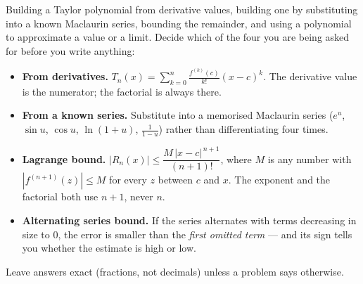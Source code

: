 \documentclass[12pt]{article}
\begin{document}

\noindent\small
Building a Taylor polynomial from derivative values, building one by
substituting into a known Maclaurin series, bounding the remainder, and using a
polynomial to approximate a value or a limit. Decide which of the four you are
being asked for before you write anything:
\begin{itemize}[leftmargin=1.1cm, itemsep=1pt, topsep=2pt]
  \item \textbf{From derivatives.}
        $T_n(x) = \displaystyle\sum_{k=0}^{n} \frac{f^{(k)}(c)}{k!}(x-c)^k$.
        The derivative value is the numerator; the factorial is always there.
  \item \textbf{From a known series.} Substitute into a memorised Maclaurin
        series ($e^u$, $\sin u$, $\cos u$, $\ln(1+u)$, $\frac{1}{1-u}$) rather
        than differentiating four times.
  \item \textbf{Lagrange bound.}
        $|R_n(x)| \le \dfrac{M\,|x-c|^{\,n+1}}{(n+1)!}$, where $M$ is any
        number with $|f^{(n+1)}(z)| \le M$ for every $z$ between $c$ and $x$.
        The exponent and the factorial both use $n+1$, never $n$.
  \item \textbf{Alternating series bound.} If the series alternates with terms
        decreasing in size to $0$, the error is smaller than the \emph{first
        omitted term} --- and its sign tells you whether the estimate is high
        or low.
\end{itemize}
Leave answers exact (fractions, not decimals) unless a problem says otherwise.
\normalsize

\vspace{0.2cm}

\end{document}
